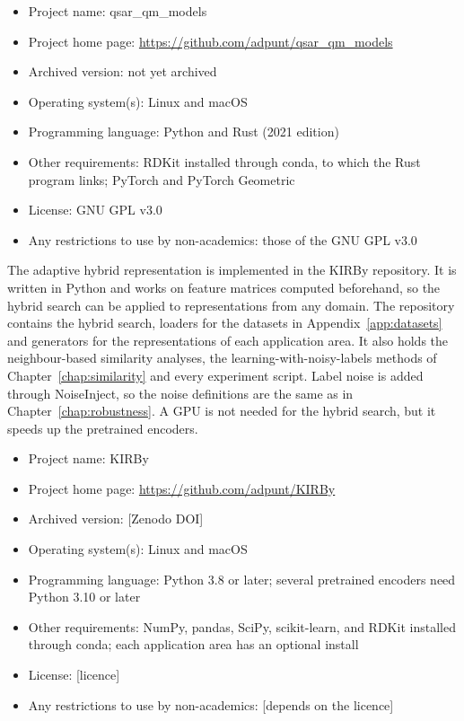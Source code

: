 \begin{itemize}
    \item Project name: qsar\_qm\_models
    \item Project home page: \url{https://github.com/adpunt/qsar_qm_models}
    \item Archived version: not yet archived
    \item Operating system(s): Linux and macOS
    \item Programming language: Python and Rust (2021 edition)
    \item Other requirements: RDKit installed through conda, to which the Rust program links; PyTorch and PyTorch Geometric
    \item License: GNU GPL v3.0
    \item Any restrictions to use by non-academics: those of the GNU GPL v3.0
\end{itemize}

The adaptive hybrid representation is implemented in the KIRBy repository. It is written in Python and works on feature matrices computed beforehand, so the hybrid search can be applied to representations from any domain. The repository contains the hybrid search, loaders for the datasets in Appendix~\ref{app:datasets} and generators for the representations of each application area. It also holds the neighbour-based similarity analyses, the learning-with-noisy-labels methods of Chapter~\ref{chap:similarity} and every experiment script. Label noise is added through NoiseInject, so the noise definitions are the same as in Chapter~\ref{chap:robustness}. A GPU is not needed for the hybrid search, but it speeds up the pretrained encoders.

\begin{itemize}
    \item Project name: KIRBy
    \item Project home page: \url{https://github.com/adpunt/KIRBy}
    \item Archived version: [Zenodo DOI]
    \item Operating system(s): Linux and macOS
    \item Programming language: Python 3.8 or later; several pretrained encoders need Python 3.10 or later
    \item Other requirements: NumPy, pandas, SciPy, scikit-learn, and RDKit installed through conda; each application area has an optional install
    \item License: [licence]
    \item Any restrictions to use by non-academics: [depends on the licence]
\end{itemize}


